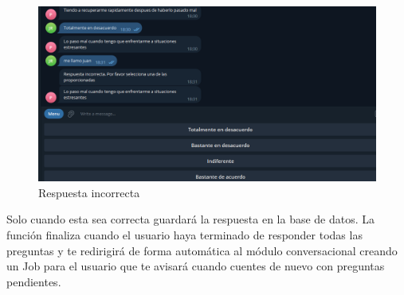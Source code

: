 \begin{figure}[!ht]
    \centering
    \includegraphics[width=1\textwidth]{imagenes/pregunta_incorrecta.png}
    \caption{ Respuesta incorrecta }
    \label{fig:enter-label}
\end{figure}\vspace{0.3cm}

Solo cuando esta sea correcta guardará la respuesta en la base de datos. La función finaliza cuando el usuario haya terminado de responder todas las preguntas y te redirigirá de forma automática al módulo conversacional creando un Job para el usuario que te avisará cuando cuentes de nuevo con preguntas pendientes. 